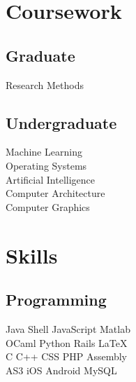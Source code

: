 \documentclass[letterpaper]{deedy-resume} %
\begin{document}
\begin{minipage}[t]{0.33\textwidth}
\sectionspace %


\section{Coursework}

\subsection{Graduate}

Research Methods \\


\sectionspace %


\subsection{Undergraduate}

Machine Learning \\
Operating Systems \\
Artificial Intelligence \\
Computer Architecture \\
Computer Graphics\\

\sectionspace %


\section{Skills}

\subsection{Programming}

Java \textbullet{} Shell \textbullet{} JavaScript \textbullet{} Matlab \\
OCaml \textbullet{} Python \textbullet{} Rails \textbullet{} \LaTeX\ \\ 
C \textbullet{} C++ \textbullet{} CSS \textbullet{} PHP \textbullet{} Assembly \\
AS3 \textbullet{} iOS \textbullet{} Android \textbullet{} MySQL

\sectionspace %


\end{minipage} %
\end{document}
